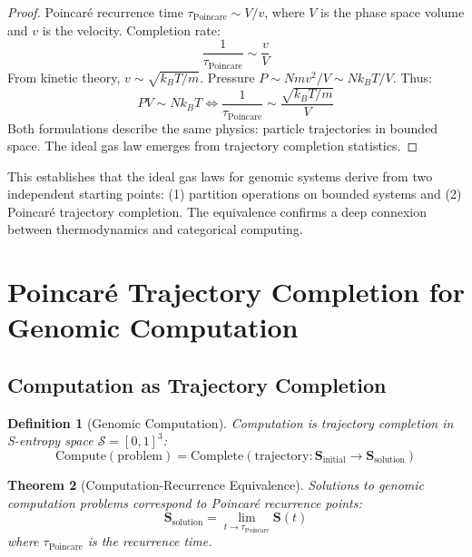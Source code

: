 \documentclass[11pt,a4paper]{article}
\newtheorem{theorem}{Theorem}[section]
\newtheorem{definition}[theorem]{Definition}
\theoremstyle{remark}
\newcommand{\Sspace}{\mathcal{S}}
\newcommand{\Scoord}{\mathbf{S}}
\begin{document}
\begin{proof}
Poincaré recurrence time $\tau_{\text{Poincare}} \sim V/v$, where $V$ is the phase space volume and $v$ is the velocity. Completion rate:
\begin{equation}
\frac{1}{\tau_{\text{Poincare}}} \sim \frac{v}{V}
\end{equation}
From kinetic theory, $v \sim \sqrt{k_BT/m}$. Pressure $P \sim Nmv^2/V \sim Nk_BT/V$. Thus:
\begin{equation}
PV \sim Nk_BT \iff \frac{1}{\tau_{\text{Poincare}}} \sim \frac{\sqrt{k_BT/m}}{V}
\end{equation}
Both formulations describe the same physics: particle trajectories in bounded space. The ideal gas law emerges from trajectory completion statistics.
\end{proof}

This establishes that the ideal gas laws for genomic systems derive from two independent starting points: (1) partition operations on bounded systems and (2) Poincaré trajectory completion. The equivalence confirms a deep connexion between thermodynamics and categorical computing.

\section{Poincaré Trajectory Completion for Genomic Computation}

\subsection{Computation as Trajectory Completion}

\begin{definition}[Genomic Computation]
\label{def:genomic_computation}
Computation is trajectory completion in S-entropy space $\Sspace = [0,1]^3$:
\begin{equation}
\text{Compute}(\text{problem}) = \text{Complete}(\text{trajectory}: \Scoord_{\text{initial}} \to \Scoord_{\text{solution}})
\end{equation}
\end{definition}

\begin{theorem}[Computation-Recurrence Equivalence]
\label{thm:computation_recurrence}
Solutions to genomic computation problems correspond to Poincaré recurrence points:
\begin{equation}
\Scoord_{\text{solution}} = \lim_{t \to \tau_{\text{Poincare}}} \Scoord(t)
\end{equation}
where $\tau_{\text{Poincare}}$ is the recurrence time.
\end{theorem}
\end{document}
